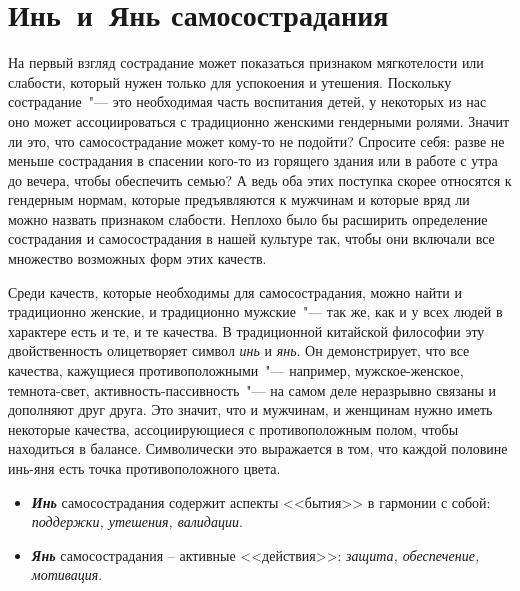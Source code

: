 
\chapter{Инь~и~Янь самосострадания} \label{The_Yin_and_Yang_of_Self-Compassion}

На первый взгляд сострадание может показаться признаком мягкотелости или слабости, который нужен только для успокоения и утешения. Поскольку сострадание~"--- это необходимая часть воспитания детей, у некоторых из нас оно может ассоциироваться с традиционно женскими гендерными ролями. Значит ли это, что самосострадание может кому-то не подойти?
Спросите себя: разве не меньше сострадания в спасении кого-то из горящего здания или в работе с утра до вечера, чтобы обеспечить семью? А ведь оба этих поступка скорее относятся к гендерным нормам, которые предъявляются к мужчинам и которые вряд ли можно назвать признаком слабости. Неплохо было бы расширить определение сострадания и самосострадания в нашей культуре так, чтобы они включали все множество возможных форм этих качеств.

Среди качеств, которые необходимы для самосострадания, можно найти и традиционно женские, и традиционно мужские~"--- так же, как и у всех людей в характере есть и те, и те качества. В традиционной китайской философии эту двойственность олицетворяет символ \textit{инь} и \textit{янь}. Он демонстрирует, что все качества, кажущиеся противоположными~"--- например, мужское-женское, темнота-свет, активность-пассивность~"--- на самом деле неразрывно связаны и дополняют друг друга. Это значит, что и мужчинам, и женщинам нужно иметь некоторые качества, ассоциирующиеся с противоположным полом, чтобы находиться в балансе. Символически это выражается в том, что каждой половине инь-яня есть точка противоположного цвета. 

\vspace{3ex}

\begin{center}
	{\Huge\Yinyang}
\end{center}

\vspace{1ex}

\begin{itemize}
	\item \textbf{\textit{Инь}} самосострадания содержит аспекты <<бытия>> в гармонии с собой: \textit{поддержки, утешения, валидации}.
	\item \textbf{\textit{Янь}} самосострадания – активные <<действия>>: \textit{защита, обеспечение, мотивация}.
\end{itemize}

